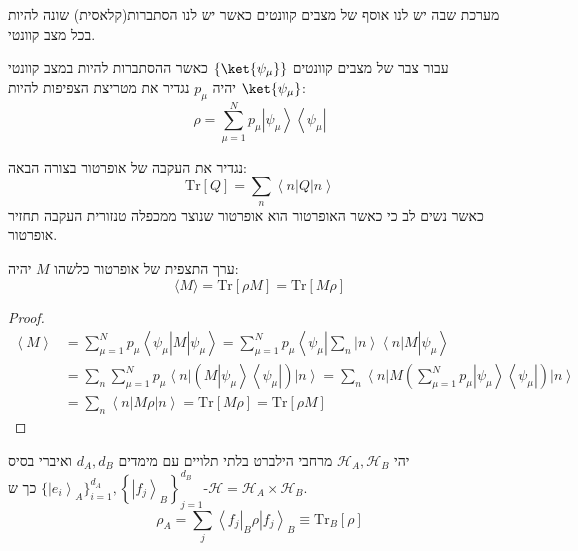 \documentclass{tstextbook}
\begin{document}
\begin{definition}
מערכת שבה יש לנו אוסף של מצבים קוונטים כאשר יש לנו הסתברות(קלאסית) שונה להיות בכל מצב קוונטי.

\end{definition}
\begin{definition}
עבור צבר של מצבים קוונטים \(\left\{  \ket{\psi_{\mu}}  \right\}\) כאשר ההסתברות להיות במצב קוונטי \(\ket{\psi_{\mu}}\) יהיה \(p_{\mu}\) נגדיר את מטריצת הצפיפות להיות:
$$\rho=\sum_{\mu=1}^{N}p_{\mu}\left|\psi_{\mu}\right\rangle\left\langle\psi_{\mu}\right|$$

\end{definition}
\begin{definition}
נגדיר את העקבה של אופרטור בצורה הבאה:
$${\mathrm{Tr}}\left[Q\right]=\sum_{n}\left\langle n\right|Q\left|n\right\rangle$$
כאשר נשים לב כי כאשר האופרטור הוא אופרטור שנוצר ממכפלה טנזורית העקבה תחזיר אופרטור.

\end{definition}
\begin{proposition}
ערך התצפית של אופרטור כלשהו \(M\) יהיה:
$$\langle M\rangle=\mathrm{Tr}\left[\rho M\right]=\mathrm{Tr}\left[M\rho\right]$$

\end{proposition}
\begin{proof}
$$ \begin{aligned}\left\langle M\right\rangle&=\sum_{\mu=1}^{N}p_{\mu}\left\langle\psi_{\mu}\right|M\left|\psi_{\mu}\right\rangle=\sum_{\mu=1}^{N}p_{\mu}\left\langle\psi_{\mu}\right|\sum_{n}\left|n\right\rangle\left\langle n\right|M\left|\psi_{\mu}\right\rangle\\&=\sum_{n}\sum_{\mu=1}^{N}p_{\mu}\left\langle n\right|\left(M\left|\psi_{\mu}\right\rangle\left\langle\psi_{\mu}\right|\right)\left|n\right\rangle=\sum_{n}\left\langle n\right|M\left(\sum_{\mu=1}^{N}p_{\mu}\left|\psi_{\mu}\right\rangle\left\langle\psi_{\mu}\right|\right)\left|n\right\rangle\\&=\sum_{n}\left\langle n\right|M\rho\left|n\right\rangle=\mathrm{Tr}\left[M\rho\right]=\mathrm{Tr}\left[\rho M\right]\end{aligned}$$

\end{proof}
\begin{definition}
יהי \(\mathcal{H}_{A},\mathcal{H}_{B}\) מרחבי הילברט בלתי תלויים עם מימדים \(d_{A},d_{B}\) ואיברי בסיס \(\{\left|e_{i}\right\rangle_{A}\}_{i=1}^{d_{A}},\left\{\left|f_{j}\right\rangle_{B}\right\}_{j=1}^{d_{B}}\) כך ש-\(\mathcal{H}=\mathcal{H}_{A}\times \mathcal{H}_{B}\). 
$$\rho_{A}=\sum_{j}\left\langle f_{j}\right|_{B}\rho\left|f_{j}\right\rangle_{B}\equiv\mathrm{Tr}_{B}\left[\rho\right]$$

\end{definition}
\end{document}
